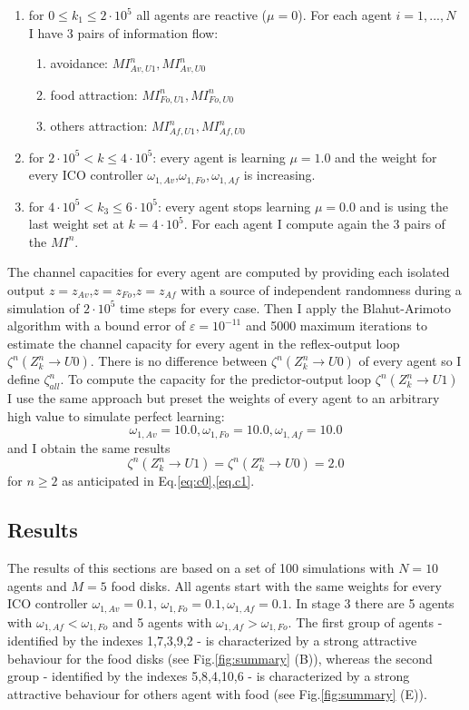 \begin{enumerate}
 \item for $0\leq k_1\leq 2 \cdot 10^5$ all agents are reactive ($\mu=0$).
	For each agent $i={1,...,N}$ I have 3 pairs of information flow:
	\begin{enumerate}
	\item avoidance: $MI^n_{Av,U1},MI^n_{Av,U0}$
	\item food attraction: $MI^n_{Fo,U1},MI^n_{Fo,U0}$
	\item others attraction: $MI^n_{Af,U1},MI^n_{Af,U0}$
	\end{enumerate}
 \item for $2 \cdot 10^5<k\leq 4 \cdot 10^5$: every agent is learning $\mu=1.0$
and the weight for every ICO controller $\omega_{1,Av}$,$\omega_{1,Fo},\omega_{1,Af}$ is increasing.
 \item for $4\cdot 10^5< k_3\leq 6 \cdot 10^5$: every agent stops learning $\mu=0.0$
and is using the last weight set at $k=4\cdot 10^5$. For each agent I compute again
the 3 pairs of the $MI^n$.
\end{enumerate}

The channel capacities for every agent are computed by providing each isolated output
$z=z_{Av}$,$z=z_{Fo}$,$z=z_{Af}$ with a source of independent randomness during a simulation
of $2\cdot 10^5$ time steps for every case.
Then I apply the Blahut-Arimoto algorithm \citep{Blahut1,Blahut2} with a bound
 error of $\varepsilon =10^{-11}$ and 5000 maximum iterations to estimate the channel
 capacity for every agent in the reflex-output loop
$\zeta^n(Z^n_k \rightarrow U0)$. There is no difference between $\zeta^n(Z^n_k \rightarrow U0)$
of every agent so I define $\zeta^n_{all}$. To compute the capacity for the predictor-output loop
$\zeta^n(Z^n_k \rightarrow U1)$ I use the same approach but preset the weights of every agent
to an arbitrary high value to simulate perfect learning:
\begin{equation}
\omega_{1,Av}=10.0,\omega_{1,Fo}=10.0,\omega_{1,Af}=10.0
\end{equation}
and I obtain the same results
\begin{equation}
\zeta^n(Z^n_k \rightarrow U1)=\zeta^n(Z^n_k \rightarrow U0)=2.0
\end{equation} for $n \geq 2$ as anticipated in Eq.\ref{eq:c0},\ref{eq.c1}.

\subsection{Results}
The results of this sections are based on a set of 100 simulations with 
$N=10$ agents and $M=5$ food disks.
All agents start with the same weights for every ICO controller $\omega_{1,Av}=0.1$,
$\omega_{1,Fo}=0.1,\omega_{1,Af}=0.1$.
In stage 3 there are 5 agents with $\omega_{1,Af}<\omega_{1,Fo}$ and 5 agents with
$\omega_{1,Af}>\omega_{1,Fo}$. 
The first group of agents - identified by the indexes 1,7,3,9,2 -
is characterized by a strong attractive 
behaviour for the food disks (see Fig.\ref{fig:summary} (B)), whereas the second group 
- identified by the indexes 5,8,4,10,6 - is characterized
by a strong attractive behaviour for others agent with food (see Fig.\ref{fig:summary} (E)). 

